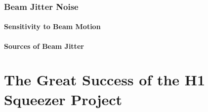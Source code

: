 \documentclass[12pt,vi,twoside]{mitthesis}
\begin{document}
\subsection{Beam Jitter Noise}
\subsubsection{Sensitivity to Beam Motion}
\subsubsection{Sources of Beam Jitter}

\chapter{The Great Success of the H1 Squeezer Project}

\appendix



\end{document}
